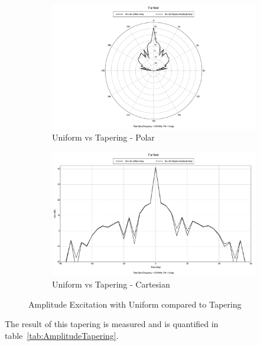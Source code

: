 \documentclass[11pt]{witseiepaper}
\begin{document}
\begin{figure}[htb]
    \centering
    \begin{subfigure}{.5\textwidth}
        \centering
            \includegraphics[width=0.9\linewidth]{AmplitudeTapering-Polar.pdf}
            \caption{Uniform vs Tapering - Polar}
            \label{fig:PowerTapering-Polar}
        \end{subfigure}%
        \begin{subfigure}{.5\textwidth}
            \centering
            \includegraphics[width=0.9\linewidth]{AmplitudeTapering-Cartesian.pdf}
            \caption{Uniform vs Tapering - Cartesian}
                \label{fig:PowerTapering-Cartesian}
            \end{subfigure}
\caption{Amplitude Excitation with Uniform compared to Tapering}
\label{fig:PowerTapering}
\end{figure}

The result of this tapering is measured and is quantified in table~\ref{tab:AmplitudeTapering}.
\end{document}
